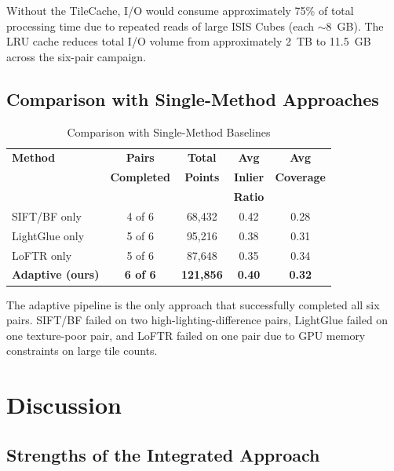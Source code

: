 \documentclass[lettersize,journal]{IEEEtran}
\begin{document}
Without the TileCache, I/O would consume approximately 75\% of total processing time due to repeated reads of large ISIS Cubes (each ${\sim}8$~GB). The LRU cache reduces total I/O volume from approximately 2~TB to 11.5~GB across the six-pair campaign.

\subsection{Comparison with Single-Method Approaches}

\begin{table}[htbp]
\caption{Comparison with Single-Method Baselines}
\label{tab:baselines}
\centering
\begin{tabular}{@{}lcccc@{}}
\toprule
\textbf{Method} & \textbf{Pairs} & \textbf{Total} & \textbf{Avg} & \textbf{Avg} \\
 & \textbf{Completed} & \textbf{Points} & \textbf{Inlier} & \textbf{Coverage} \\
 &  &  & \textbf{Ratio} &  \\
\midrule
SIFT/BF only & 4 of 6 & 68,432 & 0.42 & 0.28 \\
LightGlue only & 5 of 6 & 95,216 & 0.38 & 0.31 \\
LoFTR only & 5 of 6 & 87,648 & 0.35 & 0.34 \\
\textbf{Adaptive (ours)} & \textbf{6 of 6} & \textbf{121,856} & \textbf{0.40} & \textbf{0.32} \\
\bottomrule
\end{tabular}
\end{table}

The adaptive pipeline is the only approach that successfully completed all six pairs. SIFT/BF failed on two high-lighting-difference pairs, LightGlue failed on one texture-poor pair, and LoFTR failed on one pair due to GPU memory constraints on large tile counts.


\section{Discussion}\label{sec:discussion}

\subsection{Strengths of the Integrated Approach}
\end{document}
